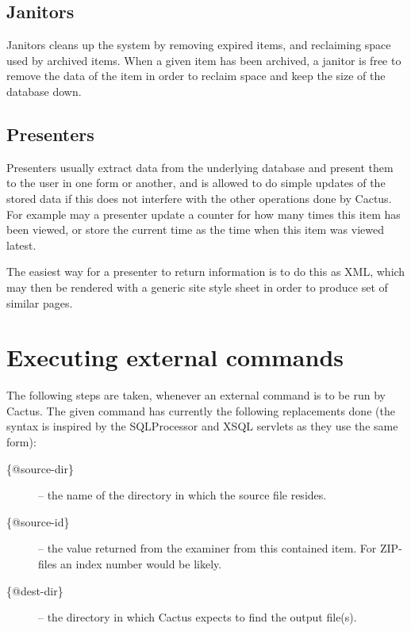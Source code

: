 \subsection{Janitors}

Janitors cleans up the system by removing expired items, and
reclaiming space used by archived items.  When a given item has been
archived, a janitor is free to remove the data of the item in order to
reclaim space and keep the size of the database down.

\subsection{Presenters}

Presenters usually extract data from the underlying database and
present them to the user in one form or another, and is allowed to do
simple updates of the stored data if this does not interfere with the
other operations done by Cactus.  For example may a presenter update a
counter for how many times this item has been viewed, or store the
current time as the time when this item was viewed latest.

The easiest way for a presenter to return information is to do this
as XML, which may then be rendered with a generic site style sheet in
order to produce set of similar pages.  

\section{Executing external commands}

The following steps are taken, whenever an external command is to be
run by Cactus.  The given command has currently the following
replacements done (the syntax is inspired by the SQLProcessor and XSQL
servlets as they use the same form):


\begin{description}

\item[\{@source-dir\}] -- the name of the directory in which the
source file resides.


\item[\{@source-id\}] -- the value returned from the examiner from
  this contained item.  For ZIP-files an index number would be likely.

\item[\{@dest-dir\}] -- the directory in which Cactus expects to find
  the output file(s).
\end{description}

